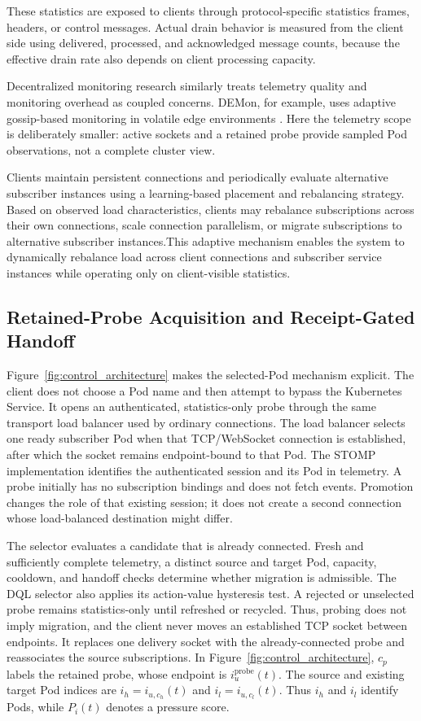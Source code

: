 \documentclass[manuscript,nonacm]{acmart}
\begin{document}
These statistics are exposed to clients through protocol-specific statistics
frames, headers, or control messages. Actual drain behavior is measured from the client side using delivered,
processed, and acknowledged message counts, because the effective drain rate also depends on client processing capacity.

Decentralized monitoring research similarly treats telemetry quality and
monitoring overhead as coupled concerns. DEMon, for example, uses adaptive
gossip-based monitoring in volatile edge environments \cite{Ilager2026DEMon}.
Here the telemetry scope is deliberately smaller: active sockets and a retained
probe provide sampled Pod observations, not a complete cluster view.

Clients maintain persistent connections and periodically evaluate alternative subscriber instances using a learning-based placement and rebalancing strategy. Based on observed load characteristics, clients may rebalance subscriptions across their own connections, scale connection parallelism, or migrate subscriptions to alternative subscriber instances.This adaptive mechanism enables the system to dynamically rebalance load across client connections and subscriber service instances while operating only on client-visible statistics.

\subsection{Retained-Probe Acquisition and Receipt-Gated Handoff}
\label{sec:probe_handoff}

Figure~\ref{fig:control_architecture} makes the selected-Pod mechanism
explicit. The client does not choose a Pod name and then attempt to bypass the
Kubernetes Service. It opens an authenticated, statistics-only probe through
the same transport load balancer used by ordinary connections. The load
balancer selects one ready subscriber Pod when that TCP/WebSocket connection is
established, after which the socket remains endpoint-bound to that Pod. The
STOMP implementation identifies the authenticated session and its Pod in
telemetry. A probe initially has no subscription bindings and does not fetch
events. Promotion changes the role of that existing session; it does not
create a second connection whose load-balanced destination might differ.

The selector evaluates a candidate that is already connected. Fresh and
sufficiently complete telemetry, a distinct source and target Pod, capacity,
cooldown, and handoff checks determine whether migration is admissible. The
DQL selector also applies its action-value hysteresis test. A rejected or
unselected probe remains statistics-only until refreshed or recycled. Thus,
probing does not imply migration, and the client never moves an established
TCP socket between endpoints. It replaces one delivery socket with the
already-connected probe and reassociates the source subscriptions.
In Figure~\ref{fig:control_architecture}, $c_p$ labels the retained probe,
whose endpoint is $i_u^{\mathrm{probe}}(t)$. The source and existing target Pod indices
are $i_h=i_{u,c_h}(t)$ and $i_l=i_{u,c_l}(t)$. Thus $i_h$ and $i_l$ identify
Pods, while $P_i(t)$ denotes a pressure score.
\end{document}
